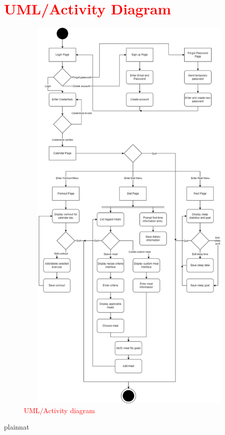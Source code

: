 \documentclass[12pt, titlepage]{article}
\begin{document}
\section{\textcolor{red}{UML/Activity Diagram}}
\begin{figure}[H]
	\centering
	\includegraphics[width=15cm, height=20cm]{4G06_UML_Activity_Diagram.png}
	\caption{\textcolor{red}{UML/Activity diagram}}
\end{figure}


 {plainnat}


\newpage{}
\end{document}
